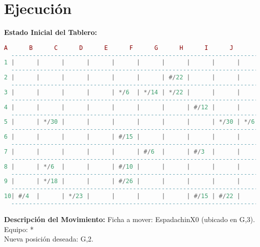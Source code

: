 \section*{Ejecución}

\textbf{Estado Inicial del Tablero:}
\begin{lstlisting}[language=lua]
     A      B      C      D      E      F      G      H      I      J
  -----------------------------------------------------------------------
1 |      |      |      |      |      |      |      |      |      |      |
  -----------------------------------------------------------------------
2 |      |      |      |      |      |      | #/22 |      |      |      |
  -----------------------------------------------------------------------
3 |      |      |      |      | */6  | */14 | */22 |      |      |      |
  -----------------------------------------------------------------------
4 |      |      |      |      |      |      |      | #/12 |      |      |
  -----------------------------------------------------------------------
5 |      | */30 |      |      |      |      |      |      | */30 | */6 |
  -----------------------------------------------------------------------
6 |      |      |      |      | #/15 |      |      |      |      |      |
  -----------------------------------------------------------------------
7 |      |      |      |      |      | #/6  |      | #/3  |      |      |
  -----------------------------------------------------------------------
8 |      | */6  |      |      | #/10 |      |      |      |      |      |
  -----------------------------------------------------------------------
9 |      | */18 |      |      | #/26 |      |      |      |      |      |
  -----------------------------------------------------------------------
10| #/4  |      | */23 |      |      |      |      | #/15 | #/22 |      |
  -----------------------------------------------------------------------
\end{lstlisting}

\textbf{Descripción del Movimiento:}
Ficha a mover: EspadachinX0 (ubicado en G,3).\\
Equipo: *\\
Nueva posición deseada: G,2.

